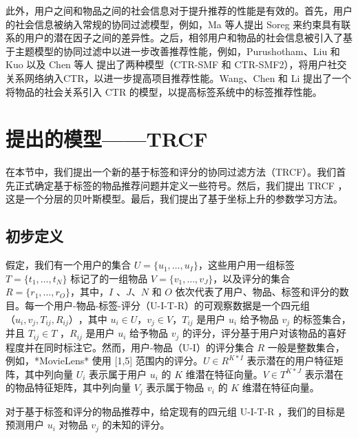 此外，用户之间和物品之间的社会信息对于提升推荐的性能是有效的\cite{Chen2013Recommender}。首先，用户的社会信息被纳入常规的协同过滤模型\cite{Jamali2010A}，例如，Ma 等人提出 Soreg 来约束具有联系的用户的潜在因子之间的差异性。之后，相邻用户和物品的社会信息被引入了基于主题模型的协同过滤中以进一步改善推荐性能，例如，Purushotham、Liu 和Kuo \cite{purushotham2012collaborative} 以及 Chen 等人 \cite{Chen2014Context} 提出了两种模型（CTR-SMF 和 CTR-SMF2），将用户社交关系网络纳入CTR，以进一步提高项目推荐性能。Wang、Chen 和 Li \cite{Chen2014Context} 提出了一个将物品的社会关系引入 CTR 的模型，以提高标签系统中的标签推荐性能。


\chapter{提出的模型——TRCF}
在本节中，我们提出一个新的基于标签和评分的协同过滤方法（TRCF）。我们首先正式确定基于标签的物品推荐问题并定义一些符号。然后，我们提出 TRCF ，这是一个分层的贝叶斯模型。最后，我们提出了基于坐标上升的参数学习方法。

\section{初步定义}
假定，我们有一个用户的集合 $U=\{u_1,\dots,u_I \}$，这些用户用一组标签 $T=\{t_1,\dots,t_N \}$ 标记了的一组物品 $V=\{v_1,\dots,v_J \}$，以及评分的集合  $R=\{r_1,\dots,r_O \}$，其中，$I$ 、$J$、$N$ 和 $O$ 依次代表了用户、物品、标签和评分的数目。每一个用户-物品-标签-评分（U-I-T-R）的可观察数据是一个四元组$（u_i, v_j, T_{ij}, R_{ij}）$，其中 $u_i \in U$，$v_j \in V$，$T_{ij}$ 是用户 $u_i$ 给予物品 $v_j$ 的标签集合，并且 $T_{ij} \in T$ ，$R_{ij}$ 是用户 $u_i$ 给予物品 $v_j$ 的评分，评分基于用户对该物品的喜好程度并在同时标注它。然而，用户-物品（U-I）的评分集合 $R$ 一般是整数集合，例如，*MovieLens* 使用 [1,5] 范围内的评分。$U \in R^{K*I}$ 表示潜在的用户特征矩阵，其中列向量 $U_i$ 表示属于用户 $u_i$ 的 $K$ 维潜在特征向量。$V \in T^{K*J}$ 表示潜在的物品特征矩阵，其中列向量 $V_j$ 表示属于物品 $v_i$ 的 $K$ 维潜在特征向量。

对于基于标签和评分的物品推荐中，给定现有的四元组 U-I-T-R ，我们的目标是预测用户 $u_i$ 对物品 $v_j$ 的未知的评分。

